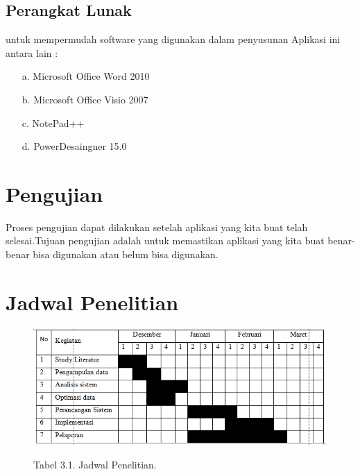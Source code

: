 \documentclass{jtetiproposalskripsi}
\begin{document}
\subsection{Perangkat Lunak} 
 untuk mempermudah software yang digunakan dalam penyusunan Aplikasi ini antara lain : 
 \begin{itemize}
\item[a.] Microsoft Office Word 2010 
\item[b.] Microsoft Office Visio 2007 
\item[c.] NotePad++
\item[d.] PowerDesaingner 15.0
 \end{itemize}



\section{Pengujian}
Proses pengujian dapat dilakukan setelah aplikasi yang kita buat telah selesai.Tujuan pengujian adalah untuk memastikan aplikasi yang kita buat benar-benar bisa digunakan atau belum bisa digunakan.

\section{ Jadwal Penelitian}


\vspace{-0.5cm}
\begin{figure}[ht!]
  \centering
    \includegraphics[width=13cm]{gambar/jadwal}
    \begin{center}
Tabel 3.1. Jadwal Penelitian.
\end{center}
\end{figure}




\end{document}
